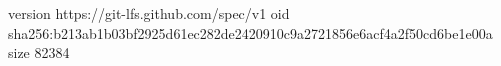 version https://git-lfs.github.com/spec/v1
oid sha256:b213ab1b03bf2925d61ec282de2420910c9a2721856e6acf4a2f50cd6be1e00a
size 82384
